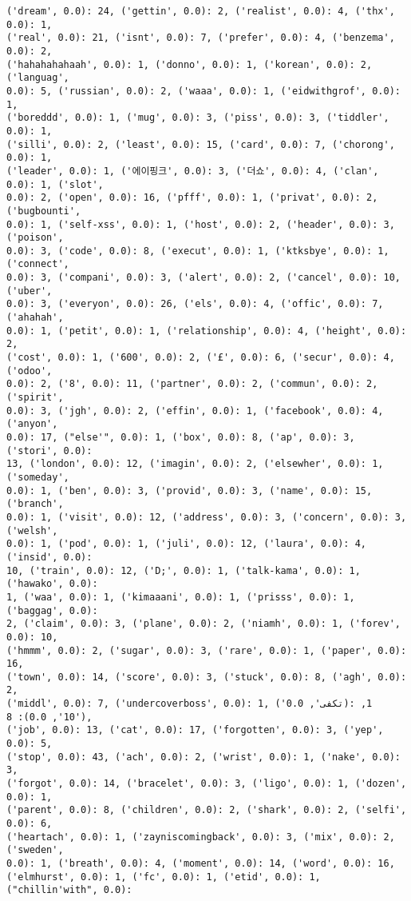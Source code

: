 \documentclass[11pt]{article}
\begin{document}
\begin{Verbatim}[commandchars=\\\{\}]
('dream', 0.0): 24, ('gettin', 0.0): 2, ('realist', 0.0): 4, ('thx', 0.0): 1,
('real', 0.0): 21, ('isnt', 0.0): 7, ('prefer', 0.0): 4, ('benzema', 0.0): 2,
('hahahahahaah', 0.0): 1, ('donno', 0.0): 1, ('korean', 0.0): 2, ('languag',
0.0): 5, ('russian', 0.0): 2, ('waaa', 0.0): 1, ('eidwithgrof', 0.0): 1,
('boreddd', 0.0): 1, ('mug', 0.0): 3, ('piss', 0.0): 3, ('tiddler', 0.0): 1,
('silli', 0.0): 2, ('least', 0.0): 15, ('card', 0.0): 7, ('chorong', 0.0): 1,
('leader', 0.0): 1, ('에이핑크', 0.0): 3, ('더쇼', 0.0): 4, ('clan', 0.0): 1, ('slot',
0.0): 2, ('open', 0.0): 16, ('pfff', 0.0): 1, ('privat', 0.0): 2, ('bugbounti',
0.0): 1, ('self-xss', 0.0): 1, ('host', 0.0): 2, ('header', 0.0): 3, ('poison',
0.0): 3, ('code', 0.0): 8, ('execut', 0.0): 1, ('ktksbye', 0.0): 1, ('connect',
0.0): 3, ('compani', 0.0): 3, ('alert', 0.0): 2, ('cancel', 0.0): 10, ('uber',
0.0): 3, ('everyon', 0.0): 26, ('els', 0.0): 4, ('offic', 0.0): 7, ('ahahah',
0.0): 1, ('petit', 0.0): 1, ('relationship', 0.0): 4, ('height', 0.0): 2,
('cost', 0.0): 1, ('600', 0.0): 2, ('£', 0.0): 6, ('secur', 0.0): 4, ('odoo',
0.0): 2, ('8', 0.0): 11, ('partner', 0.0): 2, ('commun', 0.0): 2, ('spirit',
0.0): 3, ('jgh', 0.0): 2, ('effin', 0.0): 1, ('facebook', 0.0): 4, ('anyon',
0.0): 17, ("else'", 0.0): 1, ('box', 0.0): 8, ('ap', 0.0): 3, ('stori', 0.0):
13, ('london', 0.0): 12, ('imagin', 0.0): 2, ('elsewher', 0.0): 1, ('someday',
0.0): 1, ('ben', 0.0): 3, ('provid', 0.0): 3, ('name', 0.0): 15, ('branch',
0.0): 1, ('visit', 0.0): 12, ('address', 0.0): 3, ('concern', 0.0): 3, ('welsh',
0.0): 1, ('pod', 0.0): 1, ('juli', 0.0): 12, ('laura', 0.0): 4, ('insid', 0.0):
10, ('train', 0.0): 12, ('D;', 0.0): 1, ('talk-kama', 0.0): 1, ('hawako', 0.0):
1, ('waa', 0.0): 1, ('kimaaani', 0.0): 1, ('prisss', 0.0): 1, ('baggag', 0.0):
2, ('claim', 0.0): 3, ('plane', 0.0): 2, ('niamh', 0.0): 1, ('forev', 0.0): 10,
('hmmm', 0.0): 2, ('sugar', 0.0): 3, ('rare', 0.0): 1, ('paper', 0.0): 16,
('town', 0.0): 14, ('score', 0.0): 3, ('stuck', 0.0): 8, ('agh', 0.0): 2,
('middl', 0.0): 7, ('undercoverboss', 0.0): 1, ('تكفى', 0.0): 1, ('10', 0.0): 8,
('job', 0.0): 13, ('cat', 0.0): 17, ('forgotten', 0.0): 3, ('yep', 0.0): 5,
('stop', 0.0): 43, ('ach', 0.0): 2, ('wrist', 0.0): 1, ('nake', 0.0): 3,
('forgot', 0.0): 14, ('bracelet', 0.0): 3, ('ligo', 0.0): 1, ('dozen', 0.0): 1,
('parent', 0.0): 8, ('children', 0.0): 2, ('shark', 0.0): 2, ('selfi', 0.0): 6,
('heartach', 0.0): 1, ('zayniscomingback', 0.0): 3, ('mix', 0.0): 2, ('sweden',
0.0): 1, ('breath', 0.0): 4, ('moment', 0.0): 14, ('word', 0.0): 16,
('elmhurst', 0.0): 1, ('fc', 0.0): 1, ('etid', 0.0): 1, ("chillin'with", 0.0):

\end{Verbatim}
\end{document}
